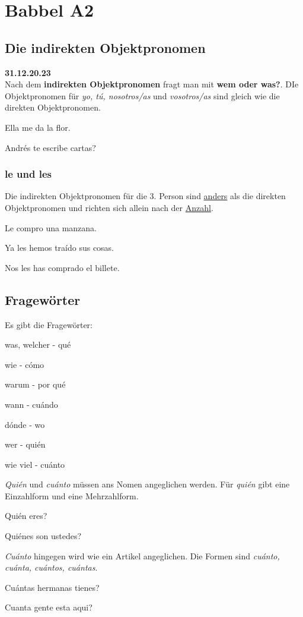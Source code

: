 \chapter{Babbel A2}
\section{Die indirekten Objektpronomen}
\textbf{31.12.20.23}\\
Nach dem \textbf{indirekten Objektpronomen} fragt man mit 
\textbf{wem oder was?}. DIe Objektpronomen für 
\textit{yo, t\'u, nosotros/as} und \textit{vosotros/as} sind 
gleich wie die direkten Objektpronomen.
\begin{ejemplos}
    \item Ella me da la flor.
    \item Andr\'es te escribe cartas?
\end{ejemplos}
\subsection*{le und les}
Die indirekten Objektpronomen für die 3. Person sind 
\underline{anders} als die direkten Objektpronomen und
richten sich allein nach der \underline{Anzahl}.
\begin{ejemplos}
    \item Le compro una manzana.
    \item Ya les hemos tra\'ido sus cosas.
    \item Nos les has comprado el billete.
\end{ejemplos}
\section{Fragewörter}
Es gibt die Fragewörter:
\begin{gramatica}
    \item was, welcher - qu\'e
    \item wie - c\'omo
    \item warum - por qu\'e
    \item wann - cu\'ando
    \item d\'onde - wo
    \item wer - qui\'en
    \item wie viel - cu\'anto
\end{gramatica}
\textit{Qui\'en} und \textit{cu\'anto} müssen ans Nomen 
angeglichen werden. Für \textit{qui\'en} gibt eine
Einzahlform und eine Mehrzahlform.
\begin{ejemplos}
    \item Qui\'en eres?
    \item Qui\'enes son ustedes?
\end{ejemplos}
\textit{Cu\'anto} hingegen wird wie ein Artikel angeglichen.
Die Formen sind \textit{cu\'anto, cu\'anta, cu\'antos, cu\'antas}. 
\begin{ejemplos}
    \item Cu\'antas hermanas tienes?
    \item Cuanta gente esta aqui?
\end{ejemplos}
